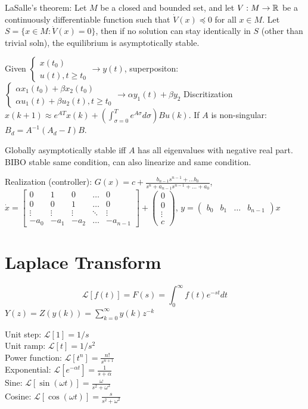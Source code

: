 \documentclass[11pt]{article}
\begin{document}
LaSalle's theorem: Let $M$ be a closed and bounded set, and let $V: M \to \mathbb{R}$ be a continuously differentiable function such that $\dot{V}(x) \preceq 0$ for all $x \in M$.
Let $S = \{x \in M: \dot{V}(x) = 0\}$, then if no solution can stay identically in $S$ (other than trivial soln), the equilibrium is asymptotically stable.


Given $\begin{cases}
    x(t_0) \\ u(t), t \geq t_0
\end{cases} \to y(t)$, superpositon: 
$\begin{cases}
    \alpha x_1(t_0) + \beta x_2(t_0) \\ \alpha u_1(t) + \beta u_2(t), t \geq t_0
\end{cases} \to \alpha y_1(t) + \beta y_2$
Discritization $x(k+1) \approx e^{AT}x(k) + (\int_{\sigma = 0} ^T e^{A\sigma}d\sigma) B u(k)$.
If $A$ is non-singular: $B_d = A^{-1}(A_d - I)B$.

Globally asymptotically stable iff $A$ has all eigenvalues with negative real part.
BIBO stable same condition, can also linearize and same condition.

Realization (controller):
$G(x) = c + \frac{b_{n-1}s^{n-1} + \dots b_0}{s^n + a_{n-1}s^{n-1} + \dots + a_0}$,
$\dot{x} = \begin{bmatrix}
    0 & 1 & 0 & \dots & 0 \\
    0 & 0 & 1 & \dots & 0 \\
    \vdots & \vdots & \vdots & \ddots & \vdots \\
    -a_0 & -a_1 & -a_2 & \dots & -a_{n-1}
\end{bmatrix} + \begin{pmatrix}
    0 \\ 0 \\ \vdots \\ c
\end{pmatrix}$, $y = \begin{pmatrix}
    b_0 & b_1 & \dots & b_{n-1}
\end{pmatrix}x$

\section{Laplace Transform}
$$\mathcal{L}[f(t)] = F(s) = \int_{0} ^ \infty f(t) e^{-st} dt $$
$Y(z) = Z(y(k)) = \sum_{k = 0} ^ \infty y(k)z^{-k}$

Unit step: $\mathcal{L}[1] = 1/s$\\
Unit ramp: $\mathcal{L}[t] = 1/s^2$\\
Power function: $\mathcal{L}[t^n] = \frac{n!}{s^{n+1}}$\\
Exponential: $\mathcal{L}[e^{-\alpha t}] = \frac{1}{s + \alpha}$\\
Sine: $\mathcal{L}[\sin(\omega t)] = \frac{\omega}{s^2 + \omega^2}$\\
Cosine: $\mathcal{L}[\cos(\omega t)] = \frac{s}{s^2 + \omega^2}$\\
\end{document}
